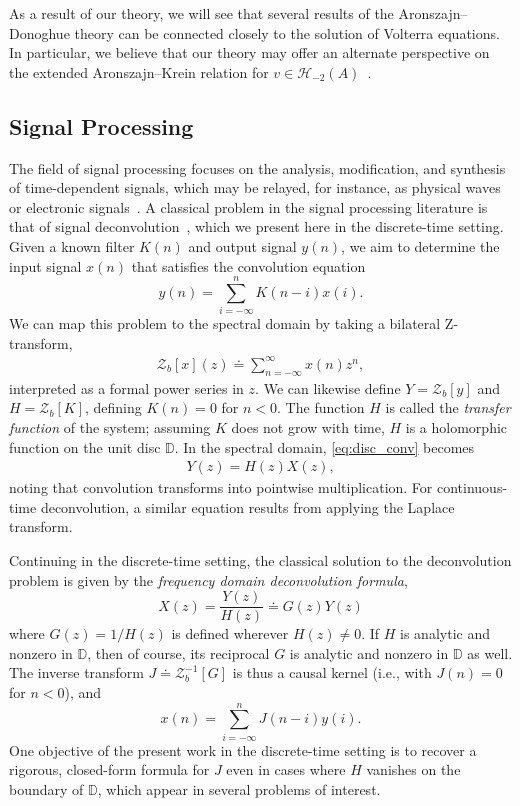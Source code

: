 \documentclass{cams-l} %
\newcommand{\dave}[1]{#1}\newcommand{\davebegin}{}\newcommand{\daveend}{}\newcommand{\george}[1]{#1}
\newcommand{\DD}{\mathbb D}
\newcommand{\cH}{\mathcal H}
\newcommand{\cZ}{\mathcal Z}
\theoremstyle{definition}
\theoremstyle{remark}
\numberwithin{equation}{section}
\begin{document}
\dave{As a result of our theory, we will see that several results of the Aronszajn--Donoghue theory can be connected closely to the solution of Volterra equations. In particular, we believe that our theory may offer an alternate perspective on the extended Aronszajn--Krein relation for $v\in\cH_{-2}(A)$~\cite{Albeverio2004}.}

\subsection{Signal Processing}\label{sec:signals}
The field of signal processing focuses on the analysis, modification, and synthesis of time-dependent signals, which may be relayed, for instance, as physical waves or electronic signals~\cite{bhattacharyya2018handbook}. A classical problem in the signal processing literature is that of signal deconvolution~\cite{riad1986deconvolution}, which we present here in the discrete-time setting. Given a known filter $K(n)$ and output signal $y(n)$, we aim to determine the input signal $x(n)$ that satisfies the convolution equation
\begin{equation}\label{eq:disc_conv}
    y(n) = \sum_{i=-\infty}^n K(n-i) x(i).
\end{equation}
We can map this problem to the spectral domain by taking a bilateral Z-transform,
\begin{align*}
    \mathcal{Z}_b[x](z) \doteq \sum_{n=-\infty}^\infty x(n)z^n,
\end{align*}
interpreted as a formal power series in $z$. We can likewise define $Y = \mathcal{Z}_b[y]$ and $H = \cZ_b[K]$, defining $K(n) = 0$ for $n<0$. The function $H$ is called the \emph{transfer function} \dave{of the system; assuming $K$ does not grow with time, $H$} is a holomorphic function on the unit disc $\DD$. \dave{In the spectral domain, \cref{eq:disc_conv} becomes
\begin{align*}
    Y(z) = H(z)X(z),
\end{align*}
noting that convolution transforms into pointwise multiplication. For continuous-time deconvolution, a similar equation results from applying the Laplace transform}.

\dave{Continuing in the discrete-time setting, the classical solution to the deconvolution problem is given by the \emph{frequency domain deconvolution formula},
\begin{equation}\label{eq:freq_deconv}
    X(z) = \frac{Y(z)}{H(z)} \doteq G(z)Y(z)
\end{equation}
where $G(z) = 1/H(z)$ is defined wherever $H(z)\neq 0$. If $H$ is analytic and nonzero in $\DD$, then of course, its reciprocal $G$ is analytic and nonzero in $\DD$ as well. The inverse transform $J\doteq \cZ_b^{-1}[G]$ is thus a causal kernel (i.e., with $J(n)=0$ for $n<0$), and
\begin{equation}\label{eq:J_disc}
    x(n) = \sum_{i=-\infty}^n J(n-i)y(i).
\end{equation}
One objective of the present work in the discrete-time setting is to recover a rigorous, closed-form formula for $J$ even in cases where $H$ vanishes on the boundary of $\DD$, which appear in several problems of interest.} 
\end{document}
